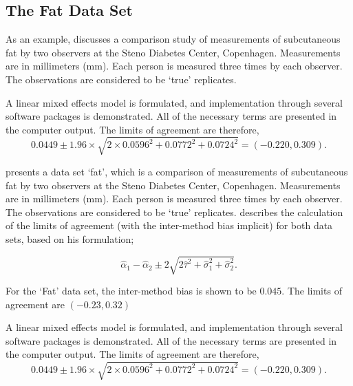 \documentclass[12pt, a4paper]{report}
\theoremstyle{plain}
\theoremstyle{definition}
\theoremstyle{remark}
\begin{document}
\subsection{The Fat Data Set}
%
As an example, \citet{BXC2008} discusses a comparison study of measurements of subcutaneous fat
by two observers at the Steno Diabetes Center, Copenhagen. Measurements are in millimeters
(mm). Each person is measured three times by each observer. The observations are considered to be `true' replicates.

A linear mixed effects model is formulated, and implementation through several software packages is demonstrated.
All of the necessary terms are presented in the computer output. The limits of agreement are therefore,
\begin{equation}
0.0449  \pm 1.96 \times  \sqrt{2 \times 0.0596^2 + 0.0772^2 + 0.0724^2} = (-0.220,  0.309).
\end{equation}


\citet{BXC2008} presents a data set `fat', which is a comparison of measurements of subcutaneous fat by two observers at the Steno Diabetes Center, Copenhagen. Measurements are in millimeters (mm). Each person is measured three times by each observer. The observations are considered to be `true' replicates.
\citet{BXC2008} describes the calculation of the limits of agreement (with the inter-method bias implicit) for both data sets, based on his formulation;

\[\hat{\alpha}_1 - \hat{\alpha}_2 \pm 2\sqrt{2\hat{\tau}^2 +\hat{\sigma}_1^2 +\hat{\sigma}_2^2 }.\]


For the `Fat' data set, the inter-method bias is shown to be $0.045$. The limits of agreement are $(-0.23 , 0.32)$



A linear mixed effects model is formulated, and implementation through several software packages is demonstrated.
All of the necessary terms are presented in the computer output. The limits of agreement are therefore,
\begin{equation}
0.0449  \pm 1.96 \times  \sqrt{2 \times 0.0596^2 + 0.0772^2 + 0.0724^2} = (-0.220,  0.309).
\end{equation}
\end{document}
